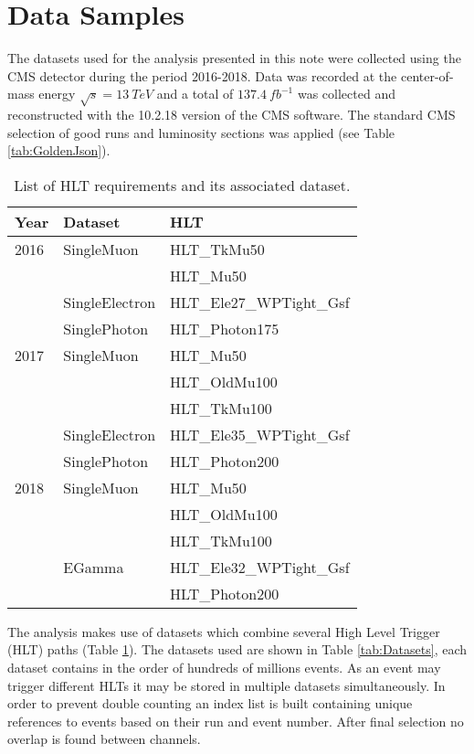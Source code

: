 \section{Data Samples}

The datasets used for the analysis presented in this note were collected using
the CMS detector during the period 2016-2018. Data was recorded at the
center-of-mass energy $\sqrt{s}=13~TeV$ and a total of $137.4~fb^{-1}$ was collected
and reconstructed with the 10.2.18 version of the CMS software. The standard
CMS selection of good runs and luminosity sections was applied
(see Table \ref{tab:GoldenJson}).


\begin{table}[h]
\centering
\caption{List of HLT requirements and its associated dataset.}
\begin{tabular}{|l|l|l|}
\hline
Year & Dataset & HLT                \\ \hline
2016 & SingleMuon     & HLT\_TkMu50 \\
     &                & HLT\_Mu50   \\
     & SingleElectron & HLT\_Ele27\_WPTight\_Gsf  \\
     & SinglePhoton   & HLT\_Photon175            \\ \hline
2017 & SingleMuon     & HLT\_Mu50       \\
     &                & HLT\_OldMu100   \\
     &                & HLT\_TkMu100    \\
     & SingleElectron & HLT\_Ele35\_WPTight\_Gsf  \\
     & SinglePhoton   & HLT\_Photon200            \\ \hline
2018 & SingleMuon & HLT\_Mu50     \\
     &            & HLT\_OldMu100 \\
     &            & HLT\_TkMu100  \\ \hline
     & EGamma     & HLT\_Ele32\_WPTight\_Gsf \\
     &            & HLT\_Photon200           \\ \hline
\end{tabular}
\label{tab:HLTDatasets}
\end{table}

The analysis makes use of datasets which combine several High Level Trigger
(HLT) paths (Table \ref{tab:HLTDatasets}). The datasets used are shown in Table \ref{tab:Datasets}, each
dataset contains in the order of hundreds of millions events. As an event
may trigger different HLTs it may be stored in multiple datasets simultaneously.
In order to prevent double counting an index list is built containing unique
references to events based on their run and event number. After final selection
no overlap is found between channels.

